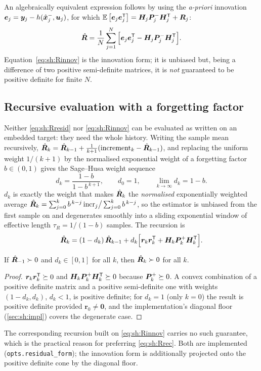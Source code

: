 An algebraically equivalent expression follows by using the \emph{a-priori} innovation
$\bm{e}_j=\bm{y}_j-h(\hat{\bm{x}}^{-}_j,\bm{u}_j)$, for which $\mathbb{E}\left[\bm{e}_j\bm{e}_j^{\mathsf{T}}\right]=\bm{H}_j\bm{P}^{-}_j\bm{H}_j^{\mathsf{T}}+\bm{R}_j$:
\begin{equation}
\hat{\bm{R}} = \frac{1}{N}\sum_{j=1}^{N}\Big[\bm{e}_j\bm{e}_j^{\mathsf{T}} - \bm{H}_j\bm{P}^{-}_j\bm{H}_j^{\mathsf{T}}\Big].
\label{eq:sh:Rinnov}
\end{equation}
Equation~\eqref{eq:sh:Rinnov} is the innovation form; it is unbiased but, being a difference of two
positive semi-definite matrices, it is \emph{not} guaranteed to be positive definite for finite $N$.

\subsection{Recursive evaluation with a forgetting factor}
Neither \eqref{eq:sh:Rresid} nor \eqref{eq:sh:Rinnov} can be evaluated as written on an embedded
target: they need the whole history.  Writing the sample mean recursively,
$\hat{\bm{R}}_k = \hat{\bm{R}}_{k-1} + \tfrac{1}{k+1}(\text{increment}_k - \hat{\bm{R}}_{k-1})$, and replacing
the uniform weight $1/(k+1)$ by the normalised exponential weight of a forgetting factor
$b\in(0,1)$ gives the Sage--Husa weight sequence
\begin{equation}
d_k = \frac{1-b}{1-b^{\,k+1}}, \qquad d_0 = 1, \qquad \lim_{k\to\infty} d_k = 1-b .
\label{eq:sh:dk}
\end{equation}
$d_k$ is exactly the weight that makes $\hat{\bm{R}}_k$ the \emph{normalised} exponentially weighted
average $\hat{\bm{R}}_k = \sum_{j=0}^{k} b^{\,k-j}\,\text{incr}_j \big/ \sum_{j=0}^{k} b^{\,k-j}$, so the
estimator is unbiased from the first sample on and degenerates smoothly into a sliding exponential
window of effective length $\tau_R = 1/(1-b)$ samples.  The recursion is
\begin{equation}
\hat{\bm{R}}_k = (1-d_k)\,\hat{\bm{R}}_{k-1} + d_k\Big[\bm{r}_k\bm{r}_k^{\mathsf{T}} + \bm{H}_k\bm{P}^{+}_k\bm{H}_k^{\mathsf{T}}\Big].
\label{eq:sh:Rrec}
\end{equation}

\begin{proposition}\label{prop:sh:pd}
If $\hat{\bm{R}}_{-1}\succ 0$ and $d_k\in[0,1]$ for all $k$, then $\hat{\bm{R}}_k\succ 0$ for all $k$.
\end{proposition}
\begin{proof}
$\bm{r}_k\bm{r}_k^{\mathsf{T}}\succeq 0$ and $\bm{H}_k\bm{P}^{+}_k\bm{H}_k^{\mathsf{T}}\succeq 0$ because $\bm{P}^{+}_k\succeq 0$.  A convex
combination of a positive definite matrix and a positive semi-definite one with weights
$(1-d_k, d_k)$, $d_k<1$, is positive definite; for $d_k=1$ (only $k=0$) the result is positive
definite provided $\bm{r}_0\neq\bm 0$, and the implementation's diagonal floor
(\cref{sec:sh:impl}) covers the degenerate case.
\end{proof}
The corresponding recursion built on \eqref{eq:sh:Rinnov} carries no such guarantee, which is the
practical reason for preferring \eqref{eq:sh:Rrec}.  Both are implemented
(\texttt{opts.residual\_form}); the innovation form is additionally projected onto the positive
definite cone by the diagonal floor.

